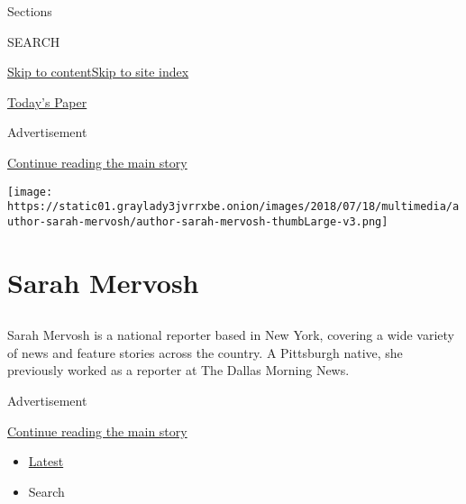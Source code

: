 Sections

SEARCH

\protect\hyperlink{site-content}{Skip to
content}\protect\hyperlink{site-index}{Skip to site index}

\href{https://myaccount.nytimes3xbfgragh.onion/auth/login?response_type=cookie\&client_id=vi}{}

\href{https://www.nytimes3xbfgragh.onion/section/todayspaper}{Today's
Paper}

Advertisement

\protect\hyperlink{after-top}{Continue reading the main story}

\texttt{[image: https://static01.graylady3jvrrxbe.onion/images/2018/07/18/multimedia/author-sarah-mervosh/author-sarah-mervosh-thumbLarge-v3.png]}

\hypertarget{sarah-mervosh}{%
\section{Sarah Mervosh}\label{sarah-mervosh}}

\hypertarget{section}{%
\subsection{}\label{section}}

Sarah Mervosh is a national reporter based in New York, covering a wide
variety of news and feature stories across the country. A Pittsburgh
native, she previously worked as a reporter at The Dallas Morning News.

Advertisement

\protect\hyperlink{after-mid1}{Continue reading the main story}

\begin{itemize}
\tightlist
\item
  \protect\hyperlink{stream-panel}{Latest}
\item
  Search
\end{itemize}

